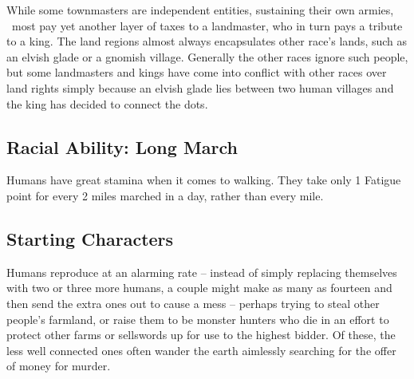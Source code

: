 \begin{multicols}{2}
While some townmasters are independent entities, sustaining their own armies, \ most pay yet another layer of taxes to a landmaster, who in turn pays a tribute to a king. The land regions almost always encapsulates other race's lands, such as an elvish glade or a gnomish village. Generally the other races ignore such people, but some landmasters and kings have come into conflict with other races over land rights simply because an elvish glade lies between two human villages and the king has decided to connect the dots.

\subsection{Racial Ability: Long March}

Humans have great stamina when it comes to walking. They take only 1 Fatigue point for every 2 miles marched in a day, rather than every mile.

\subsection{Starting Characters}

Humans reproduce at an alarming rate -- instead of simply replacing themselves with two or three more humans, a couple might make as many as fourteen and then send the extra ones out to cause a mess -- perhaps trying to steal other people's farmland, or raise them to be monster hunters who die in an effort to protect other farms or sellswords up for use to the highest bidder.
Of these, the less well connected ones often wander the earth aimlessly searching for the offer of money for murder.

\end{multicols}


